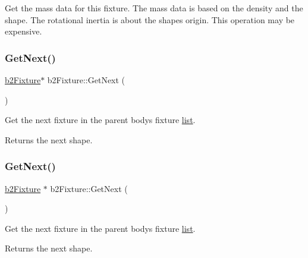 Get the mass data for this fixture. The mass data is based on the density and the shape. The rotational inertia is about the shape\textquotesingle{}s origin. This operation may be expensive. \mbox{\label{classb2Fixture_accaec7901fa27f08ec0427a6095dba09}} 
\subsubsection{\texorpdfstring{Get\+Next()}{GetNext()}\hspace{0.1cm}{\footnotesize\ttfamily [1/2]}}
{\footnotesize\ttfamily \hyperlink{classb2Fixture}{b2\+Fixture}$\ast$ b2\+Fixture\+::\+Get\+Next (\begin{DoxyParamCaption}{ }\end{DoxyParamCaption})}

Get the next fixture in the parent body\textquotesingle{}s fixture \hyperlink{protocollist-p}{list}. \begin{DoxyReturn}{Returns}
the next shape. 
\end{DoxyReturn}
\mbox{\label{classb2Fixture_a0241952461f6f1a04a3c850306390fd2}} 
\subsubsection{\texorpdfstring{Get\+Next()}{GetNext()}\hspace{0.1cm}{\footnotesize\ttfamily [2/2]}}
{\footnotesize\ttfamily \hyperlink{classb2Fixture}{b2\+Fixture} $\ast$ b2\+Fixture\+::\+Get\+Next (\begin{DoxyParamCaption}{ }\end{DoxyParamCaption})\hspace{0.3cm}{\ttfamily [inline]}}

Get the next fixture in the parent body\textquotesingle{}s fixture \hyperlink{protocollist-p}{list}. \begin{DoxyReturn}{Returns}
the next shape. 
\end{DoxyReturn}
\mbox{\label{classb2Fixture_a11240a63767be13d93209ea5ac967e4f}} 
